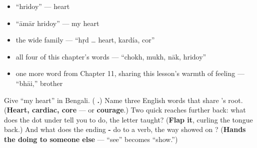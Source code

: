 \begin{itemize}
\raggedright
  \item \textquotedblleft{}hridoy\textquotedblright{} — heart
  \item \textquotedblleft{}āmār hridoy\textquotedblright{} — my heart
  \item the wide family — \textquotedblleft{}hṛd … heart, kardía, cor\textquotedblright{}
  \item all four of this chapter's words — \textquotedblleft{}chokh, mukh, nāk, hridoy\textquotedblright{}
  \item one more word from Chapter 11, sharing this lesson's warmth of feeling — \textquotedblleft{}bhāi,\textquotedblright{} brother
\end{itemize}

\begin{tcolorbox}[breakable,colback=teal!4,colframe=teal!35!black,title={Before you move on}]
Give \textquotedblleft{}my heart\textquotedblright{} in Bengali. (\textbf{ .}) Name three English words that share 's root. (\textbf{Heart, cardiac, core} — or \textbf{courage}.) Two quick reaches further back: what does the dot under  tell you to do, the letter  taught? (\textbf{Flap it}, curling the tongue back.) And what does the ending \textbf{-} do to a verb, the way  showed on ? (\textbf{Hands the doing to someone else} —  \textquotedblleft{}see\textquotedblright{} becomes  \textquotedblleft{}show.\textquotedblright{})
\end{tcolorbox}
